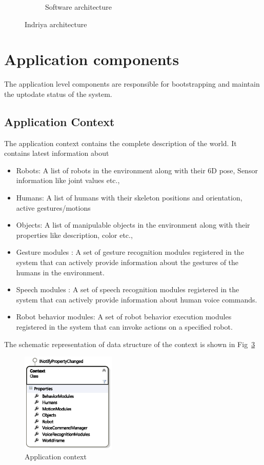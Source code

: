 \begin{figure}
\begin{subfigure}[t]{0.44\textwidth}
\caption[Software architecture]{Software architecture}
\label{fig:architecture}
\end{subfigure}
\caption[Indriya architecture]{Indriya architecture}
\label{fig:indriya_arch}
\end{figure}
\section{Application components}
\label{ssec:app_comp}
The application level components are responsible for bootstrapping and maintain the uptodate status of the system. 
\subsection*{Application Context}
The application context contains the complete description of the world. It contains latest information about
\begin{itemize}[leftmargin={1cm},topsep={0pt},itemsep={0pt},partopsep={0pt},parsep={0pt}] 
\item Robots: A list of robots in the environment along with their 6D pose, Sensor information like joint values etc.,
\item Humans: A list of humans with their skeleton positions and orientation, active gestures/motions
\item Objects: A list of manipulable objects in the environment along with their properties like description, color etc.,
\item Gesture modules : A set of gesture recognition modules registered in the system that can actively provide information about the gestures of the humans in the environment.
\item Speech modules : A set of speech recognition modules registered in the system that can actively provide information about human voice commands.
\item Robot behavior modules: A set of robot behavior execution modules registered in the system that can invoke actions on a specified robot.
\end{itemize}
The schematic representation of data structure of the context is shown in Fig~\ref{fig:system_context}
\begin{figure}
\centering
\includegraphics[width=0.4\textwidth]{assets/context_class.eps}
\caption[Application context]{Application context}
\label{fig:system_context}
\end{figure}

